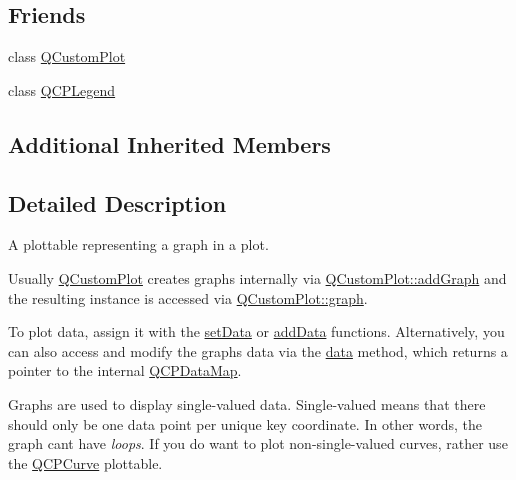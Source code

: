 \subsection*{Friends}
\begin{DoxyCompactItemize}
\item 
class \hyperlink{class_q_c_p_graph_a1cdf9df76adcfae45261690aa0ca2198}{Q\+Custom\+Plot}
\item 
class \hyperlink{class_q_c_p_graph_a8429035e7adfbd7f05805a6530ad5e3b}{Q\+C\+P\+Legend}
\end{DoxyCompactItemize}
\subsection*{Additional Inherited Members}


\subsection{Detailed Description}
A plottable representing a graph in a plot. 



Usually \hyperlink{class_q_custom_plot}{Q\+Custom\+Plot} creates graphs internally via \hyperlink{class_q_custom_plot_a6fb2873d35a8a8089842d81a70a54167}{Q\+Custom\+Plot\+::add\+Graph} and the resulting instance is accessed via \hyperlink{class_q_custom_plot_a6d3ed93c2bf46ab7fa670d66be4cddaf}{Q\+Custom\+Plot\+::graph}.

To plot data, assign it with the \hyperlink{class_q_c_p_graph_a1df2fd710545c8ba3b2c99a39a27bf8b}{set\+Data} or \hyperlink{class_q_c_p_graph_aa5c6181d84db72ce4dbe9dc15a34ef4f}{add\+Data} functions. Alternatively, you can also access and modify the graph\textquotesingle{}s data via the \hyperlink{class_q_c_p_graph_a2f58436df4f86a2792b776a21642b3d9}{data} method, which returns a pointer to the internal \hyperlink{qcustomplot_8h_a84a9c4a4c2216ccfdcb5f3067cda76e3}{Q\+C\+P\+Data\+Map}.

Graphs are used to display single-\/valued data. Single-\/valued means that there should only be one data point per unique key coordinate. In other words, the graph can\textquotesingle{}t have {\itshape loops}. If you do want to plot non-\/single-\/valued curves, rather use the \hyperlink{class_q_c_p_curve}{Q\+C\+P\+Curve} plottable.

